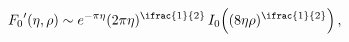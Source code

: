 \[\mathop{F_{0}\/}\nolimits'\!\left(\eta,\rho\right)\sim e^{-\pi\eta}(2\pi\eta)^%
{\ifrac{1}{2}}\mathop{I_{0}\/}\nolimits\!\left((8\eta\rho)^{\ifrac{1}{2}}%
\right),\]